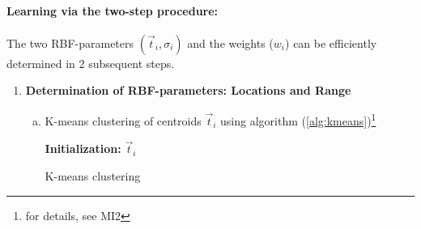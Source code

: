 \paragraph{Learning via the two-step procedure:} The two RBF-parameters
$(\vec{t}_i,\sigma_i)$ and the weights ($w_i$) can be efficiently
determined in 2 subsequent steps.

\begin{enumerate}[(1)]
\item \textbf{Determination of RBF-parameters: Locations and Range} 
  \begin{enumerate}[a.)]
  \item K-means clustering of centroids $\vec{t}_i$ using algorithm (\ref{alg:kmeans})\footnote{for details, see MI2}
\begin{algorithm}[h]
\DontPrintSemicolon
\textbf{Initialization:} $\vec{t}_i$ \;
\caption{K-means clustering}\label{alg:kmeans}
\end{algorithm}


\end{enumerate}
\end{enumerate}
